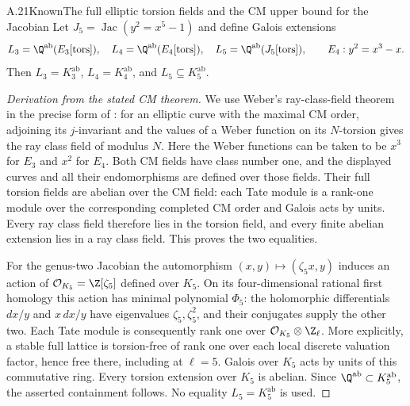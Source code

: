 \begin{statement}{A.21}{Known}{The full elliptic torsion fields and the CM upper bound for the Jacobian}
Let $J_5=\operatorname{Jac}(y^2=x^5-1)$ and define Galois extensions
\[
 L_3=\Q^{\mathrm{ab}}(E_3[\mathrm{tors}]),\quad
 L_4=\Q^{\mathrm{ab}}(E_4[\mathrm{tors}]),\quad
 L_5=\Q^{\mathrm{ab}}(J_5[\mathrm{tors}]),
 \qquad E_4:y^2=x^3-x.
\]
Then $L_3=K_3^{\mathrm{ab}}$, $L_4=K_4^{\mathrm{ab}}$, and
$L_5\subseteq K_5^{\mathrm{ab}}$.
\end{statement}
\begin{proof}[Derivation from the stated CM theorem]
We use Weber's ray-class-field theorem in the precise form of
\citet[Theorem 8]{ClarkCookStankewicz2009}: for an elliptic curve
with the maximal CM order, adjoining its $j$-invariant and the
values of a Weber function on its $N$-torsion gives the ray class
field of modulus $N$. Here the Weber functions can be taken to
be $x^3$ for $E_3$ and $x^2$ for $E_4$. Both CM fields have class
number one, and the displayed curves and all their endomorphisms
are defined over those fields. Their full torsion fields are
abelian over the CM field: each Tate module is a rank-one module
over the corresponding completed CM order and Galois acts by
units. Every ray class field therefore lies in the torsion field,
and every finite abelian extension lies in a ray class field.
This proves the two equalities.

For the genus-two Jacobian the automorphism
$(x,y)\mapsto(\zeta_5x,y)$ induces an action of
$\mathcal O_{K_5}=\Z[\zeta_5]$ defined over $K_5$. On its
four-dimensional rational first homology this action has minimal
polynomial $\Phi_5$: the holomorphic differentials $dx/y$ and
$x\,dx/y$ have eigenvalues $\zeta_5,\zeta_5^2$, and their
conjugates supply the other two. Each Tate module is consequently
rank one over $\mathcal O_{K_5}\otimes\Z_\ell$. More explicitly,
a stable full lattice is torsion-free of rank one over each
local discrete valuation factor, hence free there, including at
$\ell=5$. Galois over $K_5$ acts by units of this commutative
ring. Every torsion extension over $K_5$ is abelian. Since
$\Q^{\mathrm{ab}}\subset K_5^{\mathrm{ab}}$, the asserted
containment follows. No equality $L_5=K_5^{\mathrm{ab}}$ is used.
\end{proof}

